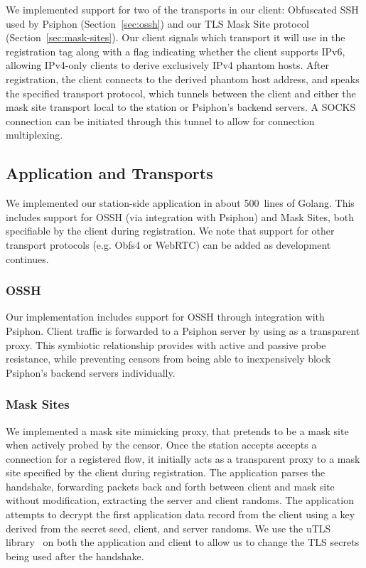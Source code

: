 \documentclass[sigconf]{acmart}
\begin{document}
We implemented support for two of the transports in our client: Obfuscated SSH used by
Psiphon (Section~\ref{sec:ossh}) and our TLS Mask Site protocol
(Section~\ref{sec:mask-sites}). Our client signals which transport it will use
in the registration tag along with a flag indicating whether the
client supports IPv6, allowing IPv4-only clients to derive exclusively IPv4 phantom hosts.
After registration, the client connects to the derived
phantom host address, and speaks the specified transport protocol, which
tunnels between the client and either the mask site transport local to the 
station or Psiphon's backend servers. A SOCKS connection can be initiated through
this tunnel to allow for connection multiplexing.


\subsection{Application and Transports} 

We implemented our station-side application in about 500~lines of Golang. This includes
support for OSSH (via integration with Psiphon) and Mask Sites, both specifiable by the client
during registration. We note that support for other transport protocols (e.g. Obfs4 or WebRTC)
can be added as development continues. 

\subsubsection{OSSH}

Our \scheme implementation includes support for OSSH through integration with Psiphon. 
Client traffic is forwarded to a Psiphon server by using  \scheme as a  
transparent proxy. This symbiotic relationship provides \scheme with active 
and passive probe resistance, while preventing censors from being able to inexpensively
block Psiphon's backend servers individually. 


\subsubsection{Mask Sites}

We implemented a mask site mimicking proxy, that pretends to be a mask site
when actively probed by the censor. Once the station accepts accepts a connection 
for a registered flow, it initially acts as a transparent
proxy to a mask site specified by the client during registration. The
application parses the handshake, forwarding packets back and forth between
client and mask site without modification, extracting the server and client
randoms. The application attempts to decrypt the first application data record
from the client using a key derived from the secret seed, client, and server
randoms. We use the uTLS library~\cite{utls,tls-fingerprint} on both the application and client
to allow us to change the TLS secrets being used after the handshake.
\end{document}
